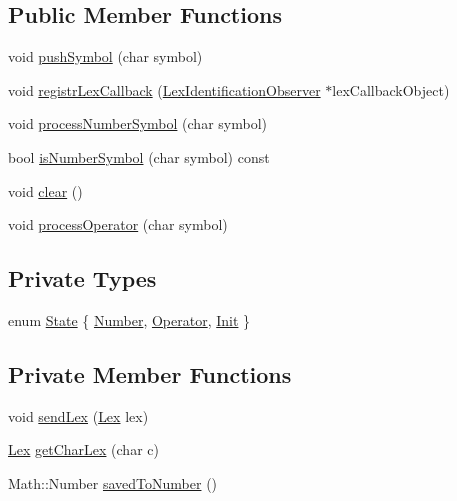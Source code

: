 \subsection*{Public Member Functions}
\begin{DoxyCompactItemize}
\item 
void \hyperlink{classteam22_1_1_calc_1_1_lexical_analyzer_af56c536f78c680bd635ac1173e65b492}{push\+Symbol} (char symbol)
\item 
void \hyperlink{classteam22_1_1_calc_1_1_lexical_analyzer_ae7fb3f4ce9e6020215352c0c9e2b8245}{registr\+Lex\+Callback} (\hyperlink{classteam22_1_1_calc_1_1_lex_identification_observer}{Lex\+Identification\+Observer} $\ast$lex\+Callback\+Object)
\item 
void \hyperlink{classteam22_1_1_calc_1_1_lexical_analyzer_a18ba04d046da0b11eec66fb2689ddfef}{process\+Number\+Symbol} (char symbol)
\item 
bool \hyperlink{classteam22_1_1_calc_1_1_lexical_analyzer_a922bf14131d064fce52bf126e8d29839}{is\+Number\+Symbol} (char symbol) const
\item 
void \hyperlink{classteam22_1_1_calc_1_1_lexical_analyzer_adf38772b29f998549aa532e8f380b4b2}{clear} ()
\item 
void \hyperlink{classteam22_1_1_calc_1_1_lexical_analyzer_ab84b6b8f52056452cd52b8abdb9a3faa}{process\+Operator} (char symbol)
\end{DoxyCompactItemize}
\subsection*{Private Types}
\begin{DoxyCompactItemize}
\item 
enum \hyperlink{classteam22_1_1_calc_1_1_lexical_analyzer_aef11ba66454715a80d5964c07f6d8cc3}{State} \{ \hyperlink{classteam22_1_1_calc_1_1_lexical_analyzer_aef11ba66454715a80d5964c07f6d8cc3a862f179df5de529676972b3b95c52f86}{Number}, 
\hyperlink{classteam22_1_1_calc_1_1_lexical_analyzer_aef11ba66454715a80d5964c07f6d8cc3ae2510b92e28892c94126aa4273470f78}{Operator}, 
\hyperlink{classteam22_1_1_calc_1_1_lexical_analyzer_aef11ba66454715a80d5964c07f6d8cc3a11976214c837f23fd71b2af8b0de3d5b}{Init}
 \}
\end{DoxyCompactItemize}
\subsection*{Private Member Functions}
\begin{DoxyCompactItemize}
\item 
void \hyperlink{classteam22_1_1_calc_1_1_lexical_analyzer_afd6bb48e5de7f8490addc9b326bfeb49}{send\+Lex} (\hyperlink{classteam22_1_1_calc_1_1_lex}{Lex} lex)
\item 
\hyperlink{classteam22_1_1_calc_1_1_lex}{Lex} \hyperlink{classteam22_1_1_calc_1_1_lexical_analyzer_a451aa3e3ed6f150d5b24fae76cc93cb4}{get\+Char\+Lex} (char c)
\item 
Math\+::\+Number \hyperlink{classteam22_1_1_calc_1_1_lexical_analyzer_a689b52c49cd7c9e87dd468987472af83}{saved\+To\+Number} ()
\end{DoxyCompactItemize}
